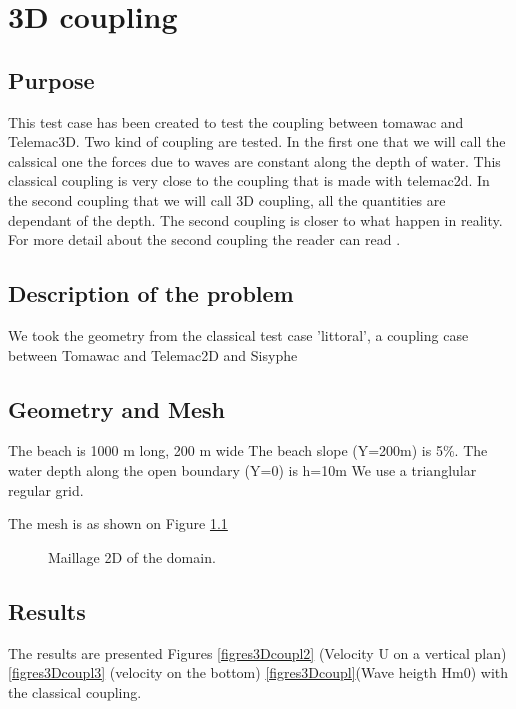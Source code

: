 \chapter{3D coupling}
%
%
\section{Purpose}
%
This test case has been created to test the coupling between tomawac and Telemac3D. Two kind of coupling are tested. In the first one that we will call the calssical one the forces due to waves are constant along the depth of water. This classical coupling is very close to the coupling that is made with telemac2d. In the second coupling that we will call 3D coupling, all the quantities are dependant of the depth. The second coupling is closer to what happen in reality. For more detail about the second coupling the reader can read \cite{Teles2013}.

%
\section{Description of the problem}
We took the geometry from the classical test case 'littoral', a coupling case between Tomawac and Telemac2D and Sisyphe
\section{Geometry and Mesh}
%
The beach is 1000 m long, 200 m wide
 The beach slope (Y=200m) is 5\%.
 The water depth along the open boundary (Y=0) is h=10m
We use a trianglular regular grid.  

The mesh is as shown on Figure \ref{3Dcouplingmesh}
\begin{figure} [!h]
\centering
{}
 \caption{Maillage 2D of the domain.}
\label{3Dcouplingmesh}
\end{figure}

\section{Results}
The results are presented Figures \ref{figres3Dcoupl2} (Velocity U on a vertical plan) \ref{figres3Dcoupl3} (velocity on the bottom) \ref{figres3Dcoupl}(Wave heigth Hm0) with the classical coupling.

